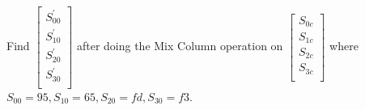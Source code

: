\documentclass[11pt]{article}
\begin{document}
Find $\begin{bmatrix}
        S_{00}^{'}\\
        S_{10}^{'}\\
        S_{20}^{'}\\
        S_{30}^{'}\\
    \end{bmatrix}$ after doing the Mix Column operation on $\begin{bmatrix}
        S_{0c}\\
        S_{1c}\\
        S_{2c}\\
        S_{3c}\\
    \end{bmatrix}$ where $S_{00} = 95, S_{10} = 65, S_{20} = fd, S_{30} = f3$.\\
\end{document}
